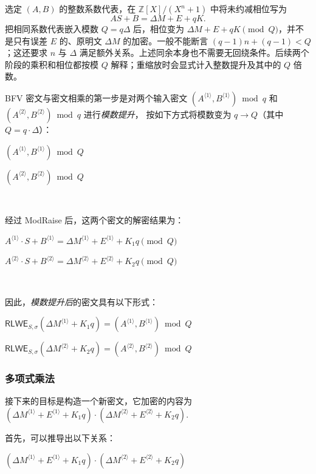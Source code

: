 选定 $(A,B)$ 的整数系数代表，在 $\mathbb Z[X]/(X^n+1)$ 中将未约减相位写为
\[
AS+B=\Delta M+E+qK.
\]
把相同系数代表嵌入模数 $Q=q\Delta$ 后，相位变为 $\Delta M+E+qK\pmod Q$，并不是只有误差 $E$ 的、原明文 $\Delta M$ 的加密。一般不能断言 $(q-1)n+(q-1)<Q$；这还要求 $n$ 与 $\Delta$ 满足额外关系。上述同余本身也不需要无回绕条件。后续两个阶段的乘积和相位都按模 $Q$ 解释；重缩放时会显式计入整数提升及其中的 $Q$ 倍数。

BFV 密文与密文相乘的第一步是对两个输入密文 $(A^{\langle 1 \rangle}, B^{\langle 1 \rangle}) \bmod q$ 和 $(A^{\langle 2 \rangle}, B^{\langle 2 \rangle}) \bmod q$ 进行\textit{模数提升}，
按如下方式将模数变为 $q \rightarrow Q$（其中 $Q = q\cdot \Delta$）：

$(A^{\langle 1 \rangle}, B^{\langle 1 \rangle}) \bmod Q$

$(A^{\langle 2 \rangle}, B^{\langle 2 \rangle}) \bmod Q$

$ $

经过 \textsf{ModRaise} 后，这两个密文的解密结果为：

$A^{\langle 1 \rangle} \cdot S + B^{\langle 1 \rangle} = \Delta M^{\langle 1 \rangle} + E^{\langle 1 \rangle} + K_1q \pmod Q$

$A^{\langle 2 \rangle} \cdot S + B^{\langle 2 \rangle} = \Delta M^{\langle 2 \rangle} + E^{\langle 2 \rangle} + K_2q \pmod Q$


$ $

因此，\textit{模数提升后}的密文具有以下形式：

$\textsf{RLWE}_{S, \sigma}(\Delta M^{\langle 1 \rangle} + K_1q) = (A^{\langle 1 \rangle}, B^{\langle 1 \rangle}) \bmod Q$

$\textsf{RLWE}_{S, \sigma}(\Delta M^{\langle 2 \rangle} + K_2q) = (A^{\langle 2 \rangle}, B^{\langle 2 \rangle}) \bmod Q$


\subsubsection{多项式乘法}
\label{subsubsec:bfv-mult-cipher-multiplication}

接下来的目标是构造一个新密文，它加密的内容为
$(\Delta M^{\langle 1 \rangle} + E^{\langle 1 \rangle} + K_1q) \cdot (\Delta M^{\langle 2 \rangle} + E^{\langle 2 \rangle} + K_2q)$. 

首先，可以推导出以下关系：

$(\Delta M^{\langle 1 \rangle} + E^{\langle 1 \rangle} + K_1q) \cdot (\Delta M^{\langle 2 \rangle} + E^{\langle 2 \rangle} + K_2q)$

